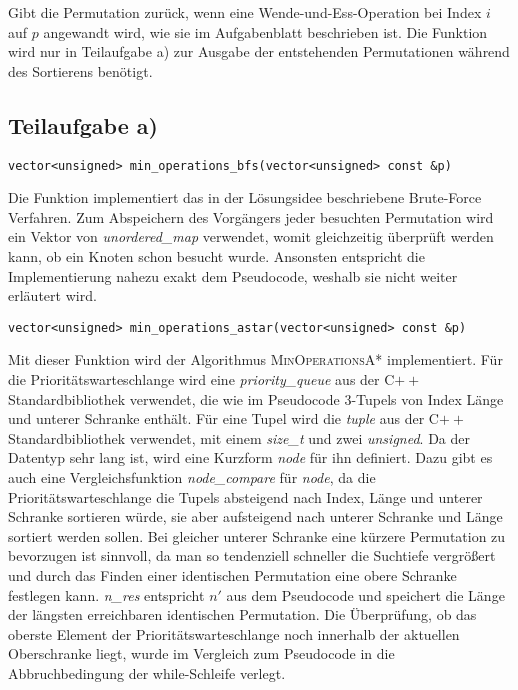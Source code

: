 \documentclass[a4paper, 11pt, ngerman]{article}
\begin{document}
\noindent Gibt die Permutation zurück, wenn eine Wende-und-Ess-Operation bei Index $i$ auf $p$ angewandt wird, wie sie im Aufgabenblatt beschrieben ist. Die Funktion wird nur in Teilaufgabe a) zur Ausgabe der entstehenden Permutationen während des Sortierens benötigt.

\subsection{Teilaufgabe a)}

\noindent \verb|vector<unsigned> min_operations_bfs(vector<unsigned> const &p)|
\smallskip

\noindent Die Funktion implementiert das in der Lösungsidee beschriebene Brute-Force Verfahren. Zum Abspeichern des Vorgängers jeder besuchten Permutation wird ein Vektor von \emph{unordered\_map} verwendet, womit gleichzeitig überprüft werden kann, ob ein Knoten schon besucht wurde. Ansonsten entspricht die Implementierung nahezu exakt dem Pseudocode, weshalb sie nicht weiter erläutert wird.
\bigskip

\noindent \verb|vector<unsigned> min_operations_astar(vector<unsigned> const &p)|
\smallskip

\noindent Mit dieser Funktion wird der Algorithmus \textsc{MinOperationsA*} implementiert. Für die Prioritätswarteschlange wird eine \emph{priority\_queue} aus der C$++$ Standardbibliothek verwendet, die wie im Pseudocode 3-Tupels von Index Länge und unterer Schranke enthält. Für eine Tupel wird die \emph{tuple} aus der C$++$ Standardbibliothek verwendet, mit einem \emph{size\_t} und zwei \emph{unsigned}. Da der Datentyp sehr lang ist, wird eine Kurzform \emph{node} für ihn definiert. Dazu gibt es auch eine Vergleichsfunktion \emph{node\_compare} für \emph{node}, da die Prioritätswarteschlange die Tupels absteigend nach Index, Länge und unterer Schranke sortieren würde, sie aber aufsteigend nach unterer Schranke und Länge sortiert werden sollen. Bei gleicher unterer Schranke eine kürzere Permutation zu bevorzugen ist sinnvoll, da man so tendenziell schneller die Suchtiefe vergrößert und durch das Finden einer identischen Permutation eine obere Schranke festlegen kann. \emph{n\_res} entspricht $n'$ aus dem Pseudocode und speichert die Länge der längsten erreichbaren identischen Permutation. Die Überprüfung, ob das oberste Element der Prioritätswarteschlange noch innerhalb der aktuellen Oberschranke liegt, wurde im Vergleich zum Pseudocode in die Abbruchbedingung der while-Schleife verlegt.
\bigskip
\end{document}
